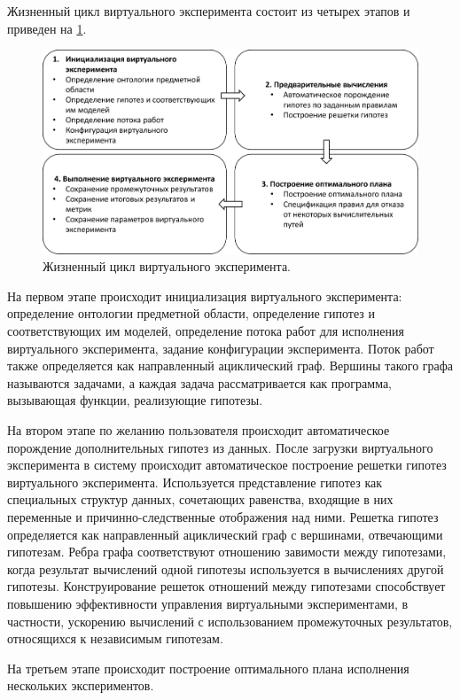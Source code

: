 Жизненный цикл виртуального эксперимента состоит из четырех этапов и приведен на \cref{fig:lifecycle_ve}. 
\begin{figure}[ht]
    \centering
    \includegraphics[width=0.9\linewidth]{images/ve_cycle.pdf}
    \caption{Жизненный цикл виртуального эксперимента.}\label{fig:lifecycle_ve}
\end{figure}


На первом этапе происходит инициализация виртуального эксперимента: определение онтологии предметной области, 
определение гипотез и соответствующих им моделей, определение потока работ для исполнения виртуального эксперимента, 
задание конфигурации эксперимента. Поток работ также определяется как направленный ациклический граф. Вершины такого 
графа называются задачами, а каждая задача рассматривается как программа, вызывающая функции, реализующие гипотезы.

На втором этапе по желанию пользователя происходит автоматическое порождение дополнительных гипотез из данных. 
После загрузки виртуального эксперимента в систему происходит автоматическое построение решетки гипотез виртуального 
эксперимента. Используется представление гипотез как специальных структур данных, сочетающих равенства, входящие в 
них переменные и причинно-следственные отображения над ними. Решетка гипотез определяется как направленный ациклический 
граф с вершинами, отвечающими гипотезам. Ребра графа соответствуют отношению завимости между гипотезами, когда 
результат вычислений одной гипотезы используется в вычислениях другой гипотезы. Конструирование решеток отношений 
между гипотезами способствует повышению эффективности управления виртуальными экспериментами, в частности, ускорению 
вычислений с использованием промежуточных результатов, относящихся к независимым гипотезам. 

На третьем этапе происходит построение оптимального плана исполнения нескольких экспериментов. 

